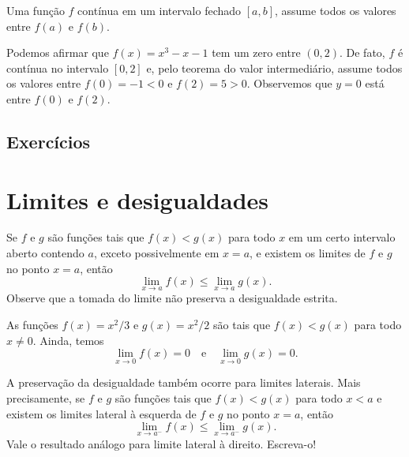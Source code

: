 \begin{teo}
  Uma função $f$ contínua em um intervalo fechado $[a, b]$, assume todos os valores entre $f(a)$ e $f(b)$.
\end{teo}

\begin{ex}
  Podemos afirmar que $f(x)=x^3-x-1$ tem um zero entre $(0, 2)$. De fato, $f$ é contínua no intervalo $[0,2]$ e, pelo teorema do valor intermediário, assume todos os valores entre $f(0)=-1<0$ e $f(2)=5>0$. Observemos que $y = 0$ está entre $f(0)$ e $f(2)$.
\end{ex}

\subsection*{Exercícios}

\emconstrucao

\section{Limites e desigualdades}\label{cap_lim_sec_limdes}

Se $f$ e $g$ são funções tais que $f(x)<g(x)$ para todo $x$ em um certo intervalo aberto contendo $a$, exceto possivelmente em $x=a$, e existem os limites de $f$ e $g$ no ponto $x=a$, então
\begin{equation}
  \lim_{x\to a} f(x) \leq \lim_{x\to a} g(x).
\end{equation}
Observe que a tomada do limite não preserva a desigualdade estrita.

\begin{exer}
  As funções $f(x) = x^2/3$ e $g(x) = x^2/2$ são tais que $f(x) < g(x)$ para todo $x\neq 0$. Ainda, temos
  \begin{equation}
    \lim_{x\to 0} f(x) = 0\quad\text{e}\quad\lim_{x\to 0} g(x) = 0.
  \end{equation}
\end{exer}

\begin{obs}
  A preservação da desigualdade também ocorre para limites laterais. Mais precisamente, se $f$ e $g$ são funções tais que $f(x)<g(x)$ para todo $x < a$ e existem os limites lateral à esquerda de $f$ e $g$ no ponto $x=a$, então
  \begin{equation}
    \lim_{x\to a^-} f(x) \leq \lim_{x\to a^-} g(x).
  \end{equation}
  Vale o resultado análogo para limite lateral à direito. Escreva-o!
\end{obs}

